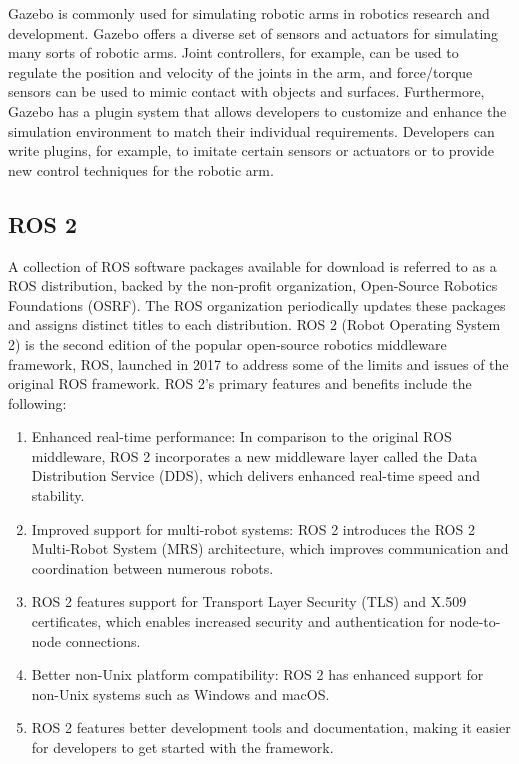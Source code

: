 \documentclass[12pt,oneside]{article}
\begin{document}
Gazebo is commonly used for simulating robotic arms in robotics research and development. Gazebo offers a diverse set of sensors and actuators for simulating many sorts of robotic arms. Joint controllers, for example, can be used to regulate the position and velocity of the joints in the arm, and force/torque sensors can be used to mimic contact with objects and surfaces. Furthermore, Gazebo has a plugin system that allows developers to customize and enhance the simulation environment to match their individual requirements. Developers can write plugins, for example, to imitate certain sensors or actuators or to provide new control techniques for the robotic arm.

\subsection{ROS 2}
A collection of ROS software packages available for download is referred to as a ROS distribution, backed by the non-profit organization, Open-Source Robotics Foundations (OSRF). The ROS organization periodically updates these packages and assigns distinct titles to each distribution.
ROS 2 (Robot Operating System 2) \cite{40_phueakthong2021development} is the second edition of the popular open-source robotics middleware framework, ROS, launched in 2017 to address some of the limits and issues of the original ROS framework. ROS 2's primary features and benefits include the following:
\begin{enumerate}
\item Enhanced real-time performance: In comparison to the original ROS middleware, ROS 2 incorporates a new middleware layer called the Data Distribution Service (DDS), which delivers enhanced real-time speed and stability.
\item Improved support for multi-robot systems: ROS 2 introduces the ROS 2 Multi-Robot System (MRS) architecture, which improves communication and coordination between numerous robots.
\item ROS 2 features support for Transport Layer Security (TLS) and X.509 certificates, which enables increased security and authentication for node-to-node connections.
\item Better non-Unix platform compatibility: ROS 2 has enhanced support for non-Unix systems such as Windows and macOS.
\item ROS 2 features better development tools and documentation, making it easier for developers to get started with the framework.
\end{enumerate}
\end{document}
